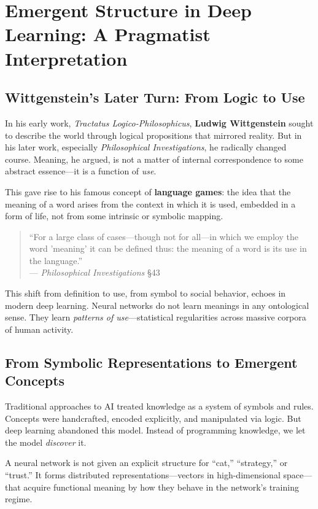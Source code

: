 \section{Emergent Structure in Deep Learning: A Pragmatist Interpretation}

\subsection{Wittgenstein’s Later Turn: From Logic to Use}

In his early work, \textit{Tractatus Logico-Philosophicus}, \textbf{Ludwig Wittgenstein} sought to describe the world through logical propositions that mirrored reality. But in his later work, especially \textit{Philosophical Investigations}, he radically changed course. Meaning, he argued, is not a matter of internal correspondence to some abstract essence—it is a function of \emph{use}.

This gave rise to his famous concept of \textbf{language games}: the idea that the meaning of a word arises from the context in which it is used, embedded in a form of life, not from some intrinsic or symbolic mapping.

\begin{quote}
    ``For a large class of cases—though not for all—in which we employ the word 'meaning' it can be defined thus: the meaning of a word is its use in the language.''\\
    — \textit{Philosophical Investigations} \S43
\end{quote}

This shift from definition to use, from symbol to social behavior, echoes in modern deep learning. Neural networks do not learn meanings in any ontological sense. They learn \emph{patterns of use}—statistical regularities across massive corpora of human activity.

\subsection{From Symbolic Representations to Emergent Concepts}

Traditional approaches to AI treated knowledge as a system of symbols and rules. Concepts were handcrafted, encoded explicitly, and manipulated via logic. But deep learning abandoned this model. Instead of programming knowledge, we let the model \emph{discover} it.

A neural network is not given an explicit structure for ``cat,'' ``strategy,'' or ``trust.'' It forms distributed representations—vectors in high-dimensional space—that acquire functional meaning by how they behave in the network’s training regime.


